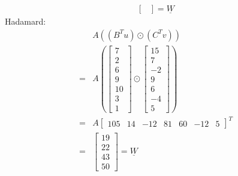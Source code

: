 \documentclass[11pt,a4paper]{article}
\begin{document}
\begin{enumerate}
\begin{enumerate}
\begin{align*}
\begin{bmatrix}
                               \end{bmatrix} = \underline{W}
                    \end{align*}
                    Hadamard:
                    \begin{align*}
                          & A((B^T u)\odot (C^T v))                                         \\
                        = & A \left ( \begin{bmatrix}
                                              7 \\ 2 \\ 6 \\ 9 \\ 10 \\ 3 \\ 1
                                          \end{bmatrix} \odot \begin{bmatrix}
                                                                  15 \\ 7 \\ -2 \\ 9 \\ 6 \\ -4 \\ 5
                                                              \end{bmatrix} \right ) \\
                        = & A \begin{bmatrix}
                                  105 & 14 & -12 & 81 & 60 & -12 & 5
                              \end{bmatrix}^T                            \\
                        = & \begin{bmatrix}
                                19 \\ 22 \\43 \\ 50
                            \end{bmatrix} = \underline{W}
                    \end{align*}
          \end{enumerate}
          \newpage


\end{enumerate}
\end{document}

